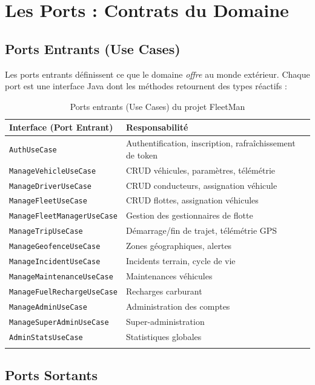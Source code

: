 \documentclass[12pt,a4paper]{report}
\begin{document}
\section{Les Ports : Contrats du Domaine}

\subsection{Ports Entrants (Use Cases)}

Les ports entrants définissent ce que le domaine \textit{offre} au monde extérieur. Chaque port est une interface Java dont les méthodes retournent des types réactifs :

\begin{longtable}{p{5.5cm}p{7.5cm}}
\toprule
\textbf{Interface (Port Entrant)} & \textbf{Responsabilité} \\
\midrule
\endhead
\texttt{AuthUseCase} & Authentification, inscription, rafraîchissement de token \\
\texttt{ManageVehicleUseCase} & CRUD véhicules, paramètres, télémétrie \\
\texttt{ManageDriverUseCase} & CRUD conducteurs, assignation véhicule \\
\texttt{ManageFleetUseCase} & CRUD flottes, assignation véhicules \\
\texttt{ManageFleetManagerUseCase} & Gestion des gestionnaires de flotte \\
\texttt{ManageTripUseCase} & Démarrage/fin de trajet, télémétrie GPS \\
\texttt{ManageGeofenceUseCase} & Zones géographiques, alertes \\
\texttt{ManageIncidentUseCase} & Incidents terrain, cycle de vie \\
\texttt{ManageMaintenanceUseCase} & Maintenances véhicules \\
\texttt{ManageFuelRechargeUseCase} & Recharges carburant \\
\texttt{ManageAdminUseCase} & Administration des comptes \\
\texttt{ManageSuperAdminUseCase} & Super-administration \\
\texttt{AdminStatsUseCase} & Statistiques globales \\
\bottomrule
\caption{Ports entrants (Use Cases) du projet FleetMan}
\end{longtable}

\subsection{Ports Sortants}
\end{document}
